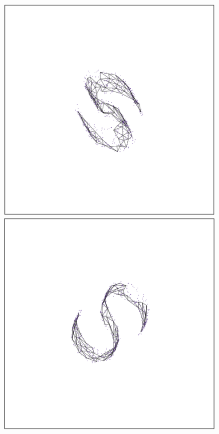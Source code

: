 \documentclass[
  12pt]{article}
\begin{document}
\begin{figure}[H]

\begin{minipage}{0.33\linewidth}
\includegraphics{figures/scurve/sc_best_1.png}\end{minipage}%
%
\begin{minipage}{0.33\linewidth}
\includegraphics{figures/scurve/sc_best_2.png}\end{minipage}%

\end{figure}
\end{document}
